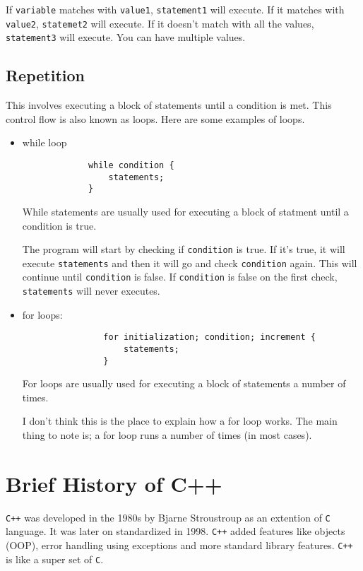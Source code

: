 \documentclass{book}
\begin{document}
If \verb|variable| matches with \verb|value1|, \verb|statement1| will execute. If it matches with \verb|value2|, \verb|statemet2| will execute. If it doesn't match with all the values, \verb|statement3| will execute. You can have multiple values.

\subsection{Repetition}
This involves executing a block of statements until a condition is met. This control flow is also known as loops. Here are some examples of loops.

\begin{itemize}
	\item while loop

		\begin{verbatim}
			 while condition {
				 statements;
			 }
		\end{verbatim}

		While statements are usually used for executing a block of statment until a condition is true.

		The program will start by checking if \verb|condition| is true. If it's true, it will execute \verb|statements| and then it will go and check \verb|condition| again. This will continue until \verb|condition| is false. If \verb|condition| is false on the first check, \verb|statements| will never executes.

	\item for loops:

		\begin{verbatim}
				for initialization; condition; increment {
					statements;
				}
		\end{verbatim}

For loops are usually used for executing a block of statements a number of times.

		I don't think this is the place to explain how a for loop works. The main thing to note is; a for loop runs a number of times (in most cases).
\end{itemize}

\section{Brief History of C++}
\verb|C++| was developed in the 1980s by Bjarne Stroustroup as an extention of \verb|C| language. It was later on standardized in 1998. \verb|C++| added features like objects (OOP), error handling using exceptions and more standard library features. \verb|C++| is like a super set of \verb|C|.
\end{document}
